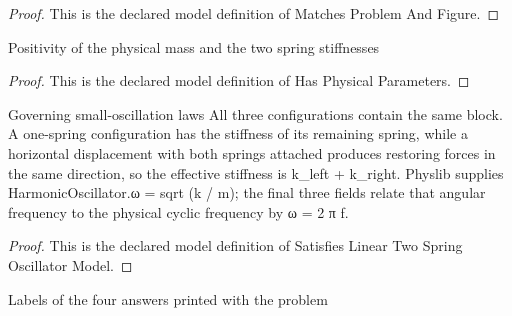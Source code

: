 \begin{proof}
  This is the declared model definition of Matches Problem And Figure.
\end{proof}
\begin{definition}
  \label{def:physics:phyx-mini-0252:phyxminiproblems-problemphyxmini0252-hasphysicalparameters}
  Positivity of the physical mass and the two spring stiffnesses
\end{definition}
\begin{proof}
  This is the declared model definition of Has Physical Parameters.
\end{proof}
\begin{definition}
  \label{def:physics:phyx-mini-0252:phyxminiproblems-problemphyxmini0252-satisfieslineartwospringoscillatormodel}
  Governing small-oscillation laws All three configurations contain the same block. A one-spring configuration has the stiffness of its remaining spring, while a horizontal displacement with both springs attached produces restoring forces in the same direction, so the effective stiffness is k\_left + k\_right. Physlib supplies HarmonicOscillator.ω = sqrt (k / m); the final three fields relate that angular frequency to the physical cyclic frequency by ω = 2 π f.
\end{definition}
\begin{proof}
  This is the declared model definition of Satisfies Linear Two Spring Oscillator Model.
\end{proof}
\begin{definition}
  \label{def:physics:phyx-mini-0252:phyxminiproblems-problemphyxmini0252-answerchoice}
  Labels of the four answers printed with the problem
\end{definition}
